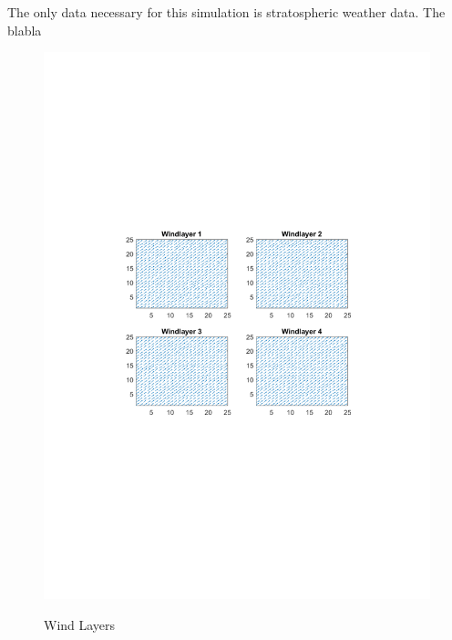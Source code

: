 The only data necessary for this simulation is stratospheric weather data. The blabla

\begin{figure}[h]
\includegraphics[trim={4cm 10cm 4cm 9cm},clip]{graphics/WindLayers.pdf}
\label{windlayers}
\caption{Wind Layers}
\end{figure}